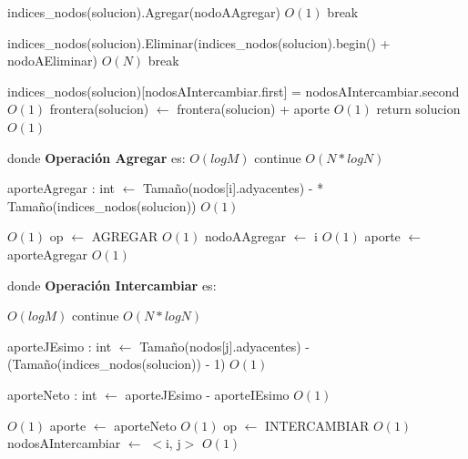 \documentclass[a4paper, 10pt, twoside]{article}
\newenvironment{pseudo}[1][]{%
    \vspace{1em}%
    \begin{algorithmic}%
}
{%
    \end{algorithmic}%
    \vspace{1em}%
}
\newcommand{\Ode}[1]{\hfill $O(#1)$}
\begin{document}
\begin{pseudo}
		    \State indices\_nodos(solucion).Agregar(nodoAAgregar) 								\Ode{1}
		    \State break
	    \EndCase

		    \State indices\_nodos(solucion).Eliminar(indices\_nodos(solucion).begin() + nodoAEliminar) \Ode{N}
		    \State break
	    \EndCase

		    \State indices\_nodos(solucion)[nodosAIntercambiar.first] = nodosAIntercambiar.second    \Ode{1}
	    \EndCase
	\EndSwitch
	\State
	\State frontera(solucion) $\leftarrow$ frontera(solucion) + aporte 								\Ode{1}
	\State return solucion 																			\Ode{1}

\EndProcedure

\State donde \textbf{Operación Agregar} es:
\State
																					\Ode{log M}
			\State continue
			\EndIf
											\Ode{N*log N}

				\State aporteAgregar : int $\leftarrow$ Tamaño(nodos[i].adyacentes) - 
				 * Tamaño(indices\_nodos(solucion))															\Ode{1}

																						\Ode{1}
					\State op $\leftarrow$ AGREGAR 																	\Ode{1}
					\State nodoAAgregar $\leftarrow$ i 																\Ode{1}
					\State aporte $\leftarrow$ aporteAgregar														\Ode{1}
				\EndIf
			\EndIf
		\EndFor

\State
\State donde \textbf{Operación Intercambiar} es:
\State

																					\Ode{log M}
					\State continue
				\EndIf
									\Ode{N*log N}

					\State aporteJEsimo : int $\leftarrow$ Tamaño(nodos[j].adyacentes) - 
					\State (Tamaño(indices\_nodos(solucion)) - 1)													\Ode{1}

					\State aporteNeto : int $\leftarrow$ aporteJEsimo - aporteIEsimo								\Ode{1}

																							\Ode{1}
						\State aporte $\leftarrow$ aporteNeto														\Ode{1}
						\State op $\leftarrow$ INTERCAMBIAR 														\Ode{1}
						\State nodosAIntercambiar $\leftarrow$ $<$i, j$>$ 											\Ode{1}
					\EndIf
				\EndIf
			\EndFor


\end{pseudo}
\end{document}

